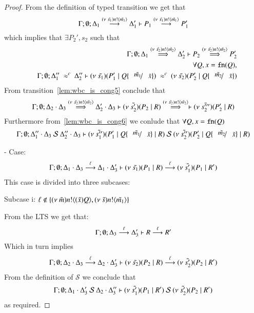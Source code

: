 \begin{proof}
	\noi From the definition of typed transition we get that
	\[
		\Gamma; \emptyset; \Delta_1 \stackrel{(\nu\ \tilde{s_1}) n ! \langle \tilde{m_1} \rangle}{\longrightarrow} \Delta_1' \vdash P_1 \stackrel{(\nu\ \tilde{s_1}) n ! \langle \tilde{m_1} \rangle}{\longrightarrow} P_1'
	\]
	\noi which implies that $\exists P_2', s_2$ such that
%
	\begin{eqnarray}
		&& \Gamma; \emptyset; \Delta_1 \By{\news{\tilde{s_2}} \bactout{n}{\tilde{m_2}}} \Delta_2' \proves P_2 \By{\news{\tilde{s_2}} \bactout{n}{\tilde{m_2}}} P_2'
		\label{lem:wbc_is_cong5}\\
		&&\forall Q, x = \fn{Q}, \nonumber \\%
		&&\Gamma; \emptyset; \Delta_1''\ \wbc\ \Delta_2'' \proves \newsp{\tilde{s_1}}{P_1' \Par Q \subst{\tilde{m_1}}{\tilde{x}}}\ \wbc\ \newsp{\tilde{s_2}}{P_2' \Par Q \subst{\tilde{m_2}}{\tilde{x}}} \label{lem:wbc_is_cong6}
	\end{eqnarray}
%
	\noi From transition~\ref{lem:wbc_is_cong5} conclude that 
	\[
		\Gamma;\emptyset; \Delta_2 \cdot \Delta_3 \stackrel{(\nu\ \tilde{s_2}) n ! \langle \tilde{m_2} \rangle}{\Longrightarrow} \Delta_2' \cdot \Delta_3 \vdash (\nu\ \tilde{s_2'})(P_2 \;|\; R) \stackrel{(\nu\ \tilde{s_2}) n ! \langle \tilde{m_2} \rangle}{\Longrightarrow} \vdash (\nu\ \tilde{s_2'''})(P_2' \;|\; R)
	\]
%
	\noi Furthermore from~\ref{lem:wbc_is_cong6} we conlude that $\forall Q, x = \mathtt{fn}(Q)$
%
	\[
		\Gamma; \emptyset; \Delta_1'' \cat \Delta_3\ \mathcal{S}\ \Delta_2'' \cat \Delta_3 \proves \newsp{\tilde{s_1''}}{P_1' \Par Q \subst{\tilde{m_1}}{\tilde{x}} \Par R}\ \mathcal{S}\ \newsp{\tilde{s_2''}}{P_2' \Par Q \subst{\tilde{m_2}}{\tilde{x}} \Par R}
	\]
%

	\noi - Case:
%
	\[
		\Gamma; \emptyset; \Delta_1 \cdot \Delta_3 \stackrel{\ell}{\longrightarrow} \Delta_1 \cdot \Delta_3' \vdash (\nu\ \tilde{s_1})(P_1 \;|\; R) \stackrel{\ell}{\longrightarrow} (\nu\ \tilde{s_1'})(P_1 \;|\; R')
	\]
%
	\noi This case is divided into three subcases:

	\noi Subcase i: $\ell \notin \{(\nu\ \tilde{m}) n ! \langle (\tilde{x})Q \rangle, (\nu\ \tilde{s}) n ! \langle \tilde{m_1} \rangle\}$

	\noi From the LTS we get that:
	\[
		\Gamma; \emptyset; \Delta_3 \stackrel{\ell}{\longrightarrow} \Delta_3' \vdash R \stackrel{\ell}{\longrightarrow} R'
	\]
%
	\noi Which in turn implies
	\begin{eqnarray*}
		\Gamma; \emptyset; \Delta_2 \cdot \Delta_3 \stackrel{\ell}{\longrightarrow} \Delta_2 \cdot \Delta_3' \vdash (\nu\ \tilde{s_2})(P_2 \;|\; R) \stackrel{\ell}{\longrightarrow} (\nu\ \tilde{s_2'})(P_2 \;|\; R')
	\end{eqnarray*}
%
	\noi From the definition of $\mathcal{S}$ we conclude that
	\[
		\Gamma; \emptyset; \Delta_1 \cdot \Delta_3'\ \mathcal{S}\ \Delta_2 \cdot \Delta_3'' \vdash (\nu\ \tilde{s_1'})(P_1 \;|\; R')\ \mathcal{S}\ (\nu\ \tilde{s_2'})(P_2 \;|\; R')
	\]
	\noi as required.


\end{proof}
